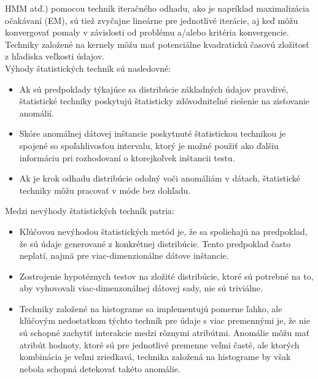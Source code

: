 HMM atď.) pomocou techník iteračného odhadu, ako je napríklad maximalizácia očakávaní
(EM), sú tiež zvyčajne lineárne pre jednotlivé iterácie, aj keď môžu konvergovať pomaly v závislosti od problému a/alebo kritéria konvergencie. Techniky založené na kernely môžu mať potenciálne  kvadratickú časovú zložitosť z hľadiska veľkosti údajov. \\
Výhody štatistických techník sú nasledovné:
\begin{itemize}
    \item Ak sú predpoklady týkajúce sa distribúcie základných údajov pravdivé, štatistické
techniky poskytujú štatisticky zdôvodniteľné riešenie na zisťovanie anomálií.
    \item Skóre anomálnej dátovej inštancie poskytnuté štatistickou technikou je spojené so spoľahlivosťou intervalu, ktorý je možné použiť ako ďalšiu informáciu pri rozhodovaní o ktorejkoľvek inštancii testu.
    \item Ak je krok odhadu distribúcie odolný voči anomáliám v dátach, štatistické techniky môžu pracovať v móde bez dohľadu.
\end{itemize}
Medzi nevýhody štatistických techník patria:
\begin{itemize}
    \item Kľúčovou nevýhodou štatistických metód je, že sa spoliehajú na predpoklad, že sú údaje  generované z konkrétnej distribúcie. Tento predpoklad často
neplatí, najmä pre viac-dimenzionálne dátove inštancie.
\item Zostrojenie hypotéznych testov na zložité distribúcie, ktoré sú potrebné na to, aby vyhovovali viac-dimenzonálnej dátovej sady, nie sú triviálne.
\item Techniky založené na histograme sa implementujú pomerne ľahko, ale kľúčovým nedostatkom týchto techník pre údaje s viac premennými je, že nie sú schopné zachytiť interakcie medzi rôznymi atribútmi. Anomálie môžu mať atribút
hodnoty, ktoré sú pre jednotlivé premenne veľmi časté, ale ktorých kombinácia je veľmi zriedkavá,  technika založená na histograme by však nebola schopná detekovať
takéto anomálie.
\end{itemize} \cite{Chandola}

